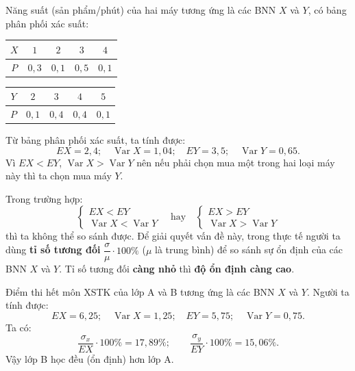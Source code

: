 \begin{vidu}[VD 18]
Năng suất (sản phẩm/phút) của hai máy tương ứng là các BNN $X$ và $Y$, có bảng phân phối xác suất:
\begin{center}
\begin{tabular}{|c|c|c|c|c|}
\hline
$X$ & $1$ & $2$ & $3$ & $4$ \\
\hline
$P$ & $0{,}3$ & $0{,}1$ & $0{,}5$ & $0{,}1$ \\
\hline
\end{tabular}
\qquad
\begin{tabular}{|c|c|c|c|c|}
\hline
$Y$ & $2$ & $3$ & $4$ & $5$ \\
\hline
$P$ & $0{,}1$ & $0{,}4$ & $0{,}4$ & $0{,}1$ \\
\hline
\end{tabular}
\end{center}
Từ bảng phân phối xác suất, ta tính được:
\[
EX = 2{,}4; \quad \operatorname{Var} X = 1{,}04; \quad EY = 3{,}5; \quad \operatorname{Var} Y = 0{,}65.
\]
Vì $EX < EY$, $\operatorname{Var} X > \operatorname{Var} Y$ nên nếu phải chọn mua một trong hai loại máy này thì ta chọn mua máy $Y$.
\end{vidu}

\begin{chuy}
Trong trường hợp:
\[
\begin{cases}
EX < EY \\
\operatorname{Var} X < \operatorname{Var} Y
\end{cases}
\quad \text{hay} \quad
\begin{cases}
EX > EY \\
\operatorname{Var} X > \operatorname{Var} Y
\end{cases}
\]
thì ta không thể so sánh được. Để giải quyết vấn đề này, trong thực tế người ta dùng \textbf{tỉ số tương đối} $\dfrac{\sigma}{\mu} \cdot 100\%$ ($\mu$ là trung bình) để so sánh sự ổn định của các BNN $X$ và $Y$. Tỉ số tương đối \textbf{càng nhỏ} thì \textbf{độ ổn định càng cao}.
\end{chuy}

\begin{vidu}[VD 19]
Điểm thi hết môn XSTK của lớp A và B tương ứng là các BNN $X$ và $Y$. Người ta tính được:
\[
EX = 6{,}25; \quad \operatorname{Var} X = 1{,}25; \quad EY = 5{,}75; \quad \operatorname{Var} Y = 0{,}75.
\]
Ta có:
\[
\frac{\sigma_x}{EX} \cdot 100\% = 17{,}89\%; \qquad \frac{\sigma_y}{EY} \cdot 100\% = 15{,}06\%.
\]
Vậy lớp B học đều (ổn định) hơn lớp A.
\end{vidu}

